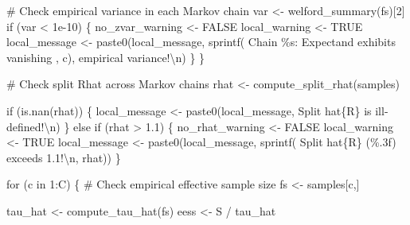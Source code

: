 \documentclass[
  letterpaper,
  DIV=11,
  numbers=noendperiod]{scrartcl}
\newenvironment{Shaded}{\begin{snugshade}}{\end{snugshade}}
\newcommand{\CommentTok}[1]{\textcolor[rgb]{0.37,0.37,0.37}{#1}}
\newcommand{\ConstantTok}[1]{\textcolor[rgb]{0.56,0.35,0.01}{#1}}
\newcommand{\ControlFlowTok}[1]{\textcolor[rgb]{0.00,0.23,0.31}{#1}}
\newcommand{\DecValTok}[1]{\textcolor[rgb]{0.68,0.00,0.00}{#1}}
\newcommand{\FloatTok}[1]{\textcolor[rgb]{0.68,0.00,0.00}{#1}}
\newcommand{\FunctionTok}[1]{\textcolor[rgb]{0.28,0.35,0.67}{#1}}
\newcommand{\NormalTok}[1]{\textcolor[rgb]{0.00,0.23,0.31}{#1}}
\newcommand{\OtherTok}[1]{\textcolor[rgb]{0.00,0.23,0.31}{#1}}
\newcommand{\SpecialCharTok}[1]{\textcolor[rgb]{0.37,0.37,0.37}{#1}}
\newcommand{\StringTok}[1]{\textcolor[rgb]{0.13,0.47,0.30}{#1}}
\begin{document}
\begin{Shaded}
\begin{Highlighting}[]
      \CommentTok{\# Check empirical variance in each Markov chain}
\NormalTok{      var }\OtherTok{\textless{}{-}} \FunctionTok{welford\_summary}\NormalTok{(fs)[}\DecValTok{2}\NormalTok{]}
      \ControlFlowTok{if}\NormalTok{ (var }\SpecialCharTok{\textless{}} \FloatTok{1e{-}10}\NormalTok{) \{}
\NormalTok{        no\_zvar\_warning }\OtherTok{\textless{}{-}} \ConstantTok{FALSE}
\NormalTok{        local\_warning }\OtherTok{\textless{}{-}} \ConstantTok{TRUE}
\NormalTok{        local\_message }\OtherTok{\textless{}{-}}
          \FunctionTok{paste0}\NormalTok{(local\_message,}
                 \FunctionTok{sprintf}\NormalTok{(}\StringTok{\textquotesingle{}  Chain \%s: Expectand exhibits vanishing \textquotesingle{}}\NormalTok{, c),}
                         \StringTok{\textquotesingle{}empirical variance!}\SpecialCharTok{\textbackslash{}n}\StringTok{\textquotesingle{}}\NormalTok{)}
\NormalTok{      \}}
\NormalTok{    \}}
  
    \CommentTok{\# Check split Rhat across Markov chains}
\NormalTok{    rhat }\OtherTok{\textless{}{-}} \FunctionTok{compute\_split\_rhat}\NormalTok{(samples)}

    \ControlFlowTok{if}\NormalTok{ (}\FunctionTok{is.nan}\NormalTok{(rhat)) \{}
\NormalTok{      local\_message }\OtherTok{\textless{}{-}} \FunctionTok{paste0}\NormalTok{(local\_message,}
                              \StringTok{\textquotesingle{}  Split hat\{R\} is ill{-}defined!}\SpecialCharTok{\textbackslash{}n}\StringTok{\textquotesingle{}}\NormalTok{)}
\NormalTok{    \} }\ControlFlowTok{else} \ControlFlowTok{if}\NormalTok{ (rhat }\SpecialCharTok{\textgreater{}} \FloatTok{1.1}\NormalTok{) \{}
\NormalTok{      no\_rhat\_warning }\OtherTok{\textless{}{-}} \ConstantTok{FALSE}
\NormalTok{      local\_warning }\OtherTok{\textless{}{-}} \ConstantTok{TRUE}
\NormalTok{      local\_message }\OtherTok{\textless{}{-}}
        \FunctionTok{paste0}\NormalTok{(local\_message,}
               \FunctionTok{sprintf}\NormalTok{(}\StringTok{\textquotesingle{}  Split hat\{R\} (\%.3f) exceeds 1.1!}\SpecialCharTok{\textbackslash{}n}\StringTok{\textquotesingle{}}\NormalTok{, rhat))}
\NormalTok{    \}}

    \ControlFlowTok{for}\NormalTok{ (c }\ControlFlowTok{in} \DecValTok{1}\SpecialCharTok{:}\NormalTok{C) \{}
      \CommentTok{\# Check empirical effective sample size}
\NormalTok{      fs }\OtherTok{\textless{}{-}}\NormalTok{ samples[c,]}
      
\NormalTok{      tau\_hat }\OtherTok{\textless{}{-}} \FunctionTok{compute\_tau\_hat}\NormalTok{(fs)}
\NormalTok{      eess }\OtherTok{\textless{}{-}}\NormalTok{ S }\SpecialCharTok{/}\NormalTok{ tau\_hat}
      

\end{Highlighting}
\end{Shaded}
\end{document}
